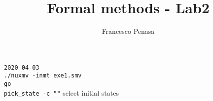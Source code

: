 \documentclass[11pt]{article}
\begin{document}
\author{Francesco Penasa}
\title{Formal methods - Lab2}
\maketitle

\medskip

\texttt{2020 04 03}\\
\texttt{./nuxmv -inmt exe1.smv}\\
\texttt{go}\\
\texttt{pick_state -c ""} select initial states
\end{document}
